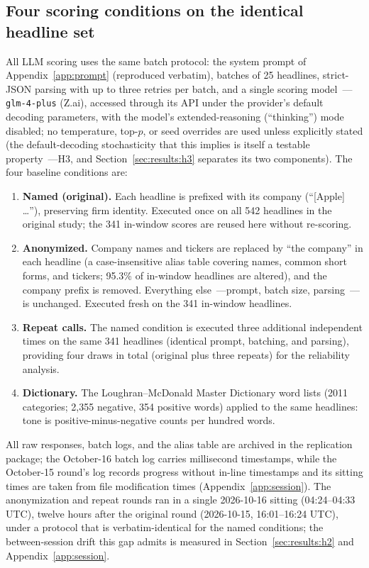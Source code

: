\subsection{Four scoring conditions on the identical headline set}\label{sec:data:conditions}

All LLM scoring uses the same batch protocol: the system prompt of Appendix~\ref{app:prompt} (reproduced verbatim), batches of 25 headlines, strict-JSON parsing with up to three retries per batch, and a single scoring model~---\texttt{glm-4-plus} (Z.ai), accessed through its API under the provider's default decoding parameters, with the model's extended-reasoning (``thinking'') mode disabled; no temperature, top-$p$, or seed overrides are used unless explicitly stated (the default-decoding stochasticity that this implies is itself a testable property~---H3, and Section~\ref{sec:results:h3} separates its two components). The four baseline conditions are:

\begin{enumerate}[leftmargin=1.8em, itemsep=2pt]
\item \textbf{Named (original).} Each headline is prefixed with its company (``[Apple] \dots''), preserving firm identity. Executed once on all 542 headlines in the original study; the 341 in-window scores are reused here without re-scoring.
\item \textbf{Anonymized.} Company names and tickers are replaced by ``the company'' in each headline (a case-insensitive alias table covering names, common short forms, and tickers; 95.3\% of in-window headlines are altered), and the company prefix is removed. Everything else~---prompt, batch size, parsing~---is unchanged. Executed fresh on the 341 in-window headlines.
\item \textbf{Repeat calls.} The named condition is executed three additional independent times on the same 341 headlines (identical prompt, batching, and parsing), providing four draws in total (original plus three repeats) for the reliability analysis.
\item \textbf{Dictionary.} The Loughran--McDonald Master Dictionary word lists (2011 categories; 2,355 negative, 354 positive words) applied to the same headlines: tone is positive-minus-negative counts per hundred words.
\end{enumerate}

All raw responses, batch logs, and the alias table are archived in the replication package; the October-16 batch log carries millisecond timestamps, while the October-15 round's log records progress without in-line timestamps and its sitting times are taken from file modification times (Appendix~\ref{app:session}). The anonymization and repeat rounds ran in a single 2026-10-16 sitting (04:24--04:33 UTC), twelve hours after the original round (2026-10-15, 16:01--16:24 UTC), under a protocol that is verbatim-identical for the named conditions; the between-session drift this gap admits is measured in Section~\ref{sec:results:h2} and Appendix~\ref{app:session}.


